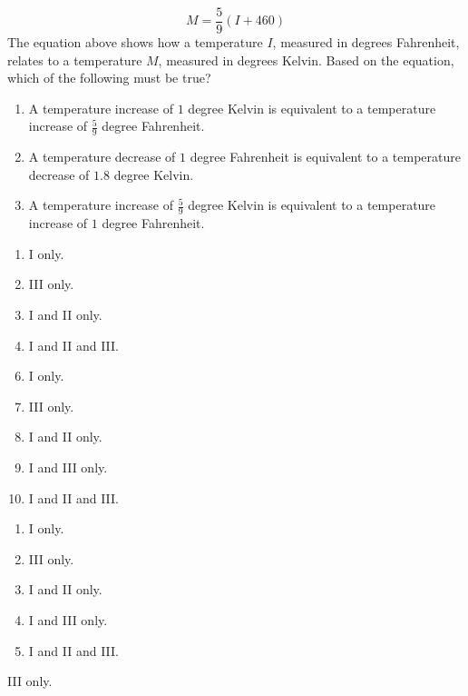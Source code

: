  
$$ M=\frac{5}{9}(I+460)$$
The equation above shows how a temperature $I$, measured in degrees Fahrenheit, relates to a temperature $M$, measured in degrees Kelvin.  Based on the equation, which of the following must be true?
\begin{enumerate}[label=\Roman*.]
\item A temperature increase of $1$ degree Kelvin is equivalent to a temperature increase of $\frac{5}{9}$ degree Fahrenheit.
\item A temperature decrease of $1$ degree Fahrenheit is equivalent to a temperature decrease of $1.8$ degree Kelvin.
\item A temperature increase of $\frac{5}{9}$ degree Kelvin is equivalent to a temperature increase of $1$ degree Fahrenheit.
\end{enumerate}


\ifsat
	\begin{enumerate}[label=\Alph*)]
		\item I only.   
		\item III only. %
		\item I and II only.
		\item I and II and III.
	\end{enumerate}
\else
\fi

\ifacteven
	\begin{enumerate}[label=\textbf{\Alph*.},itemsep=\fill,align=left]
		\setcounter{enumii}{5}
		\item I only.   
		\item III only. %
		\item I and II only.
		\addtocounter{enumii}{1}
		\item I and III only.
		\item I and II and III.
	\end{enumerate}
\else
\fi

\ifactodd
	\begin{enumerate}[label=\textbf{\Alph*.},itemsep=\fill,align=left]
		\item I only.   
		\item III only. %
		\item I and II only.
		\item I and III only.
		\item I and II and III.
	\end{enumerate}
\else
\fi

\ifgridin
 III only. %
		
\else
\fi

